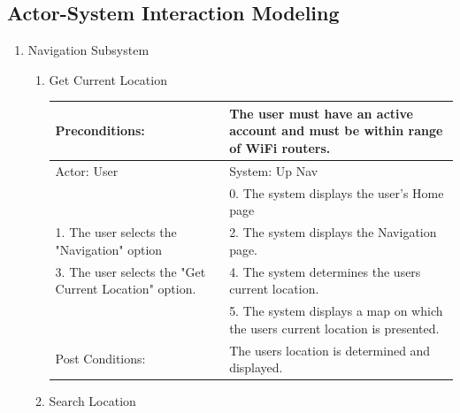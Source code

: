 \documentclass{article}
\begin{document}
\begin{center}
\subsection{Actor-System Interaction Modeling}
	
\begin{enumerate}
\item{Navigation Subsystem}
	\begin{enumerate}
	\item{Get Current Location}
	\begin{table}[]
	\centering
	
		\begin{tabular}{ | m{15em} | m{15em}| } 
		\hline
		Preconditions: 							& The user must have an active account and must be within range of WiFi routers. \\
		\hline
		Actor: User 								&  System: Up Nav \\ 
		\hline
											& 0. The system  displays the user's Home page\\ 
		\hline
		1. The user selects the "Navigation" option			& 2. The system displays the Navigation page. \\
		\hline
		3. The user selects the "Get Current Location" option. 	& 4. The system determines the users current location. \\
		\hline																
											& 5. The system displays a map on which the users current location is presented. \\
		\hline
		Post Conditions: 							& The users location is determined and displayed. \\
		\hline
		\end{tabular}
	\end{table}

	\item{Search Location}


\end{enumerate}
\end{enumerate}
\end{center}
\end{document}
